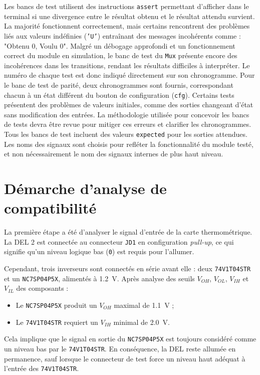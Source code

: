 \documentclass[a11paper]{article}
\begin{document}
Les bancs de test utilisent des instructions \texttt{assert} permettant
d’afficher dans le terminal si une divergence entre le résultat obtenu et le
résultat attendu survient. La majorité fonctionnent correctement, mais
certains rencontrent des problèmes liés aux valeurs indéfinies (\texttt{'U'})
entraînant des messages incohérents comme : "Obtenu 0, Voulu 0".
Malgré un débogage approfondi et un fonctionnement correct du module en
simulation, le banc de test du \texttt{Mux} présente encore des incohérences
dans les transitions, rendant les résultats difficiles à interpréter. Le
numéro de chaque test est donc indiqué directement sur son chronogramme.
Pour le banc de test de parité, deux chronogrammes sont fournis,
correspondant chacun à un état différent du bouton de configuration
(\texttt{cfg}). Certains tests présentent des problèmes de valeurs initiales,
comme des sorties changeant d'état sans modification des entrées. La
méthodologie utilisée pour concevoir les bancs de tests devra être revue pour
mitiger ces erreurs et clarifier les chronogrammes.
Tous les bancs de test incluent des valeurs \texttt{expected} pour les
sorties attendues. Les noms des signaux sont choisis pour refléter la
fonctionnalité du module testé, et non nécessairement le nom des signaux
internes de plus haut niveau.

\section{Démarche d'analyse de compatibilité}

La première étape a été d'analyser le signal d'entrée de la carte
thermométrique. La DEL 2 est connectée au connecteur \texttt{JD1} en
configuration \textit{pull-up}, ce qui signifie qu'un niveau logique bas
(\texttt{0}) est requis pour l'allumer.

Cependant, trois inverseurs sont connectés en série avant elle : deux
\texttt{74V1T04STR} et un \texttt{NC7SP04P5X}, alimentés à \SI{1.2}{V}. Après
analyse des seuils $V_{OH}$, $V_{OL}$, $V_{IH}$ et $V_{IL}$ des composants :


\begin{itemize}
	\item Le \texttt{NC7SP04P5X} produit un $V_{OH}$ maximal de \SI{1.1}{V} ;
	\item Le \texttt{74V1T04STR} requiert un $V_{IH}$ minimal de \SI{2.0}{V}.
\end{itemize}

Cela implique que le signal en sortie du \texttt{NC7SP04P5X} est toujours
considéré comme un niveau bas par le \texttt{74V1T04STR}. En conséquence, la
DEL reste allumée en permanence, sauf lorsque le connecteur de test force un
niveau haut adéquat à l’entrée des \texttt{74V1T04STR}.


\end{document}
